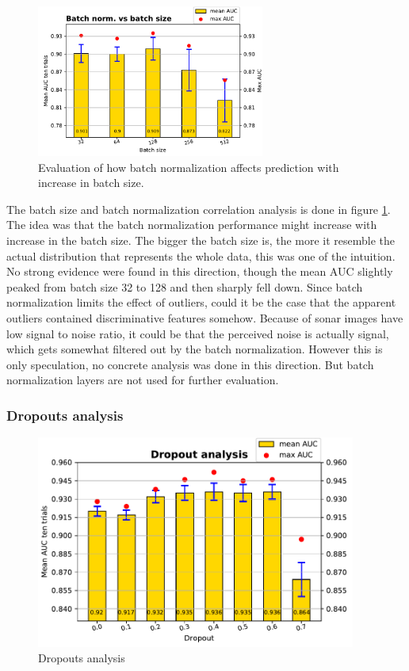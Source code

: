 \begin{figure}[ht]
\centering
\includegraphics[height= 5cm]{images/contrastive/contrastive_loss_bnvsbs_bar}
\caption{Evaluation of how batch normalization affects prediction with increase in batch size.}
\label{fig:contrastive_loss_bnvsbs_bar}
\end{figure}

The batch size and batch normalization correlation analysis is done in figure \ref{fig:contrastive_loss_bnvsbs_bar}. The idea was that the batch normalization performance might increase with increase in the batch size. The 
bigger the batch size is, the more it resemble the actual distribution that represents the whole data, this was one of the intuition. No strong evidence were found in this direction, though the mean AUC slightly peaked from 
batch size 32 to 128 and then sharply fell down. Since batch normalization limits the effect of outliers, could it be the case that the apparent outliers contained discriminative features somehow. Because of sonar images 
have low signal to noise ratio, it could be that the perceived noise is actually signal, which gets somewhat filtered out by the batch normalization. However this is only speculation, no concrete analysis was done in this 
direction. But batch normalization layers are not used for further evaluation.

\subsubsection{Dropouts analysis}


\begin{figure}[ht]
\centering
\includegraphics[height= 7cm]{images/contrastive/contrastive_loss_dropout_bar}
\caption{Dropouts analysis}
\label{fig:contrastive_loss_dropout_bar}
\end{figure}

